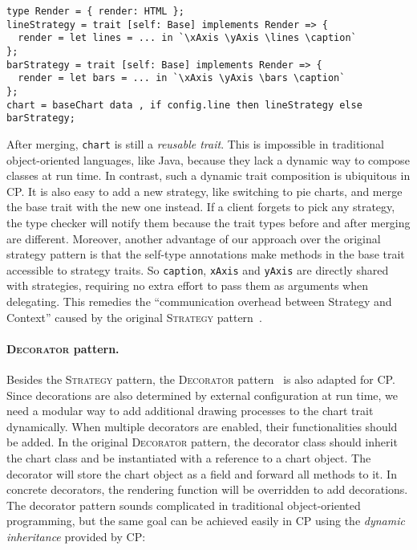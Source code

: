 \begin{lstlisting}
type Render = { render: HTML };
lineStrategy = trait [self: Base] implements Render => {
  render = let lines = ... in `\xAxis \yAxis \lines \caption`
};
barStrategy = trait [self: Base] implements Render => {
  render = let bars = ... in `\xAxis \yAxis \bars \caption`
};
chart = baseChart data , if config.line then lineStrategy else barStrategy;
\end{lstlisting}

\noindent
After merging, \lstinline{chart} is still a \emph{reusable trait}. This is
impossible in traditional object-oriented languages, like Java, because they
lack a dynamic way to compose classes at run time. In contrast, such a dynamic
trait composition is ubiquitous in CP. It is also easy to add a new strategy,
like switching to pie charts, and merge the base trait with the new one instead.
If a client forgets to pick any strategy, the type checker will notify them
because the trait types before and after merging are different. Moreover,
another advantage of our approach over the original strategy pattern is that the
self-type annotations make methods in the base trait accessible to strategy
traits. So \lstinline{caption}, \lstinline{xAxis} and \lstinline{yAxis} are
directly shared with strategies, requiring no extra effort to pass them as
arguments when delegating. This remedies the ``communication overhead between
Strategy and Context'' caused by the original \textsc{Strategy}
pattern~\citep{gamma1995design}.

\paragraph{\textsc{Decorator} pattern.}
Besides the \textsc{Strategy} pattern, the \textsc{Decorator}
pattern~\citep{gamma1995design} is also adapted for CP. Since decorations are
also determined by external configuration at run time, we need a modular way to
add additional drawing processes to the chart trait dynamically. When multiple
decorators are enabled, their functionalities should be added. In the original
\textsc{Decorator} pattern, the decorator class should inherit the chart class
and be instantiated with a reference to a chart object. The decorator will store
the chart object as a field and forward all methods to it. In concrete
decorators, the rendering function will be overridden to add decorations. The
decorator pattern sounds complicated in traditional object-oriented programming,
but the same goal can be achieved easily in CP using the \emph{dynamic
inheritance} provided by CP:

